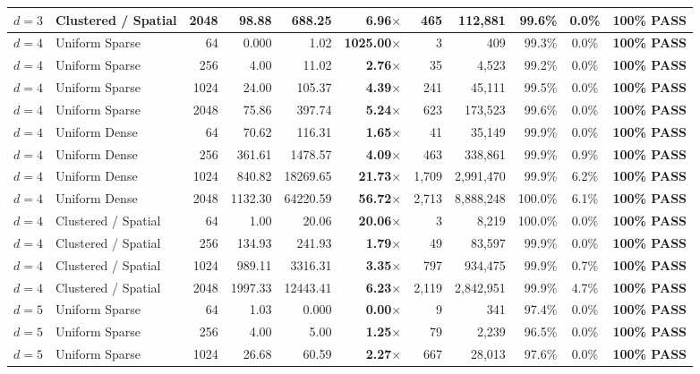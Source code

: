 \begin{table}[t]
\begin{tabular}{llr rrrrr rcc}
$d = 3$ & Clustered / Spatial & 2048 & 98.88 & 688.25 & \textbf{6.96$\times$} & 465 & 112,881 & 99.6\% & 0.0\% & \textbf{100\% PASS} \\
\midrule
$d = 4$ & Uniform Sparse & 64 & 0.000 & 1.02 & \textbf{1025.00$\times$} & 3 & 409 & 99.3\% & 0.0\% & \textbf{100\% PASS} \\
$d = 4$ & Uniform Sparse & 256 & 4.00 & 11.02 & \textbf{2.76$\times$} & 35 & 4,523 & 99.2\% & 0.0\% & \textbf{100\% PASS} \\
$d = 4$ & Uniform Sparse & 1024 & 24.00 & 105.37 & \textbf{4.39$\times$} & 241 & 45,111 & 99.5\% & 0.0\% & \textbf{100\% PASS} \\
$d = 4$ & Uniform Sparse & 2048 & 75.86 & 397.74 & \textbf{5.24$\times$} & 623 & 173,523 & 99.6\% & 0.0\% & \textbf{100\% PASS} \\
$d = 4$ & Uniform Dense & 64 & 70.62 & 116.31 & \textbf{1.65$\times$} & 41 & 35,149 & 99.9\% & 0.0\% & \textbf{100\% PASS} \\
$d = 4$ & Uniform Dense & 256 & 361.61 & 1478.57 & \textbf{4.09$\times$} & 463 & 338,861 & 99.9\% & 0.9\% & \textbf{100\% PASS} \\
$d = 4$ & Uniform Dense & 1024 & 840.82 & 18269.65 & \textbf{21.73$\times$} & 1,709 & 2,991,470 & 99.9\% & 6.2\% & \textbf{100\% PASS} \\
$d = 4$ & Uniform Dense & 2048 & 1132.30 & 64220.59 & \textbf{56.72$\times$} & 2,713 & 8,888,248 & 100.0\% & 6.1\% & \textbf{100\% PASS} \\
$d = 4$ & Clustered / Spatial & 64 & 1.00 & 20.06 & \textbf{20.06$\times$} & 3 & 8,219 & 100.0\% & 0.0\% & \textbf{100\% PASS} \\
$d = 4$ & Clustered / Spatial & 256 & 134.93 & 241.93 & \textbf{1.79$\times$} & 49 & 83,597 & 99.9\% & 0.0\% & \textbf{100\% PASS} \\
$d = 4$ & Clustered / Spatial & 1024 & 989.11 & 3316.31 & \textbf{3.35$\times$} & 797 & 934,475 & 99.9\% & 0.7\% & \textbf{100\% PASS} \\
$d = 4$ & Clustered / Spatial & 2048 & 1997.33 & 12443.41 & \textbf{6.23$\times$} & 2,119 & 2,842,951 & 99.9\% & 4.7\% & \textbf{100\% PASS} \\
\midrule
$d = 5$ & Uniform Sparse & 64 & 1.03 & 0.000 & \textbf{0.00$\times$} & 9 & 341 & 97.4\% & 0.0\% & \textbf{100\% PASS} \\
$d = 5$ & Uniform Sparse & 256 & 4.00 & 5.00 & \textbf{1.25$\times$} & 79 & 2,239 & 96.5\% & 0.0\% & \textbf{100\% PASS} \\
$d = 5$ & Uniform Sparse & 1024 & 26.68 & 60.59 & \textbf{2.27$\times$} & 667 & 28,013 & 97.6\% & 0.0\% & \textbf{100\% PASS} \\

\end{tabular}
\end{table}
